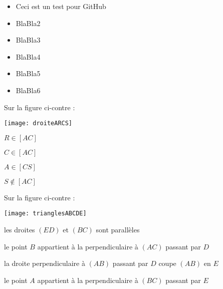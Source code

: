 \begin{acquis}
\begin{itemize}
\item Ceci est un test pour GitHub
\item BlaBla2
\item BlaBla3
\item BlaBla4
\item BlaBla5
\item BlaBla6
\end{itemize}
\end{acquis} 


\begin{QCM}
  \begin{GroupeQCM}
    \begin{exercice}
     Sur la figure ci-contre : \vspace{-2em} \begin{center} \texttt{[image: droiteARCS]} \end{center} \vspace{-1em}
      \begin{ChoixQCM}{4}
      \item $R \in [AC]$
      \item $C \in [AC]$
      \item $A \in [CS]$
      \item $S \notin [AC]$
      \end{ChoixQCM}
\begin{corrige}
   \end{corrige}
    \end{exercice}
 
    
    \begin{exercice}
     Sur la figure ci-contre : \vspace{-2em}\begin{center}\texttt{[image: trianglesABCDE]}\end{center}\vspace{-1em}
      \begin{ChoixQCM}{4}
      \item les droites $(ED)$ et $(BC)$ sont parallèles
      \item le point $B$ appartient à la perpendiculaire à $(AC)$ passant par $D$
      \item la droite perpendiculaire à $(AB)$ passant par $D$ coupe $(AB)$ en $E$
      \item le point $A$ appartient à la  perpendiculaire à $(BC)$ passant par $E$
      \end{ChoixQCM}
\begin{corrige}
   \end{corrige}
    \end{exercice}



\end{GroupeQCM}
\end{QCM}
